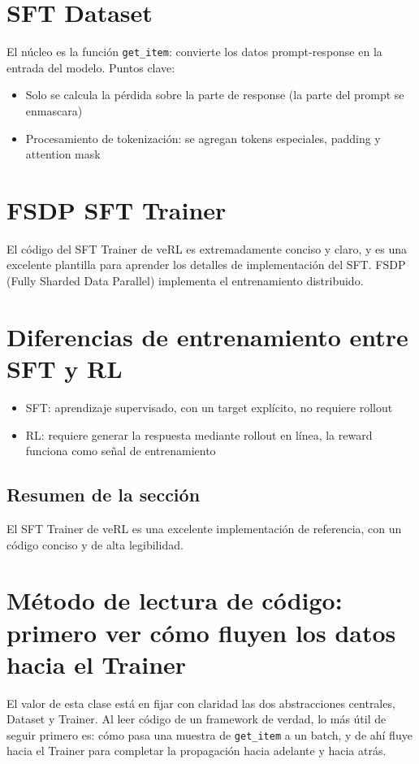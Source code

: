 \documentclass[a4paper]{article}
\begin{document}
\section{SFT Dataset}
El núcleo es la función \texttt{get\_item}: convierte los datos prompt-response en la entrada del modelo. Puntos clave:
\begin{itemize}
  \item Solo se calcula la pérdida sobre la parte de response (la parte del prompt se enmascara)
  \item Procesamiento de tokenización: se agregan tokens especiales, padding y attention mask
\end{itemize}

\section{FSDP SFT Trainer}
El código del SFT Trainer de veRL es extremadamente conciso y claro, y es una excelente plantilla para aprender los detalles de implementación del SFT. FSDP (Fully Sharded Data Parallel) implementa el entrenamiento distribuido.

\section{Diferencias de entrenamiento entre SFT y RL}
\begin{itemize}
  \item SFT: aprendizaje supervisado, con un target explícito, no requiere rollout
  \item RL: requiere generar la respuesta mediante rollout en línea, la reward funciona como señal de entrenamiento
\end{itemize}

\subsection{Resumen de la sección}
El SFT Trainer de veRL es una excelente implementación de referencia, con un código conciso y de alta legibilidad.

\newpage
\section{Método de lectura de código: primero ver cómo fluyen los datos hacia el Trainer}
El valor de esta clase está en fijar con claridad las dos abstracciones centrales, Dataset y Trainer. Al leer código de un framework de verdad, lo más útil de seguir primero es: cómo pasa una muestra de \texttt{get\_item} a un batch, y de ahí fluye hacia el Trainer para completar la propagación hacia adelante y hacia atrás.
\end{document}
